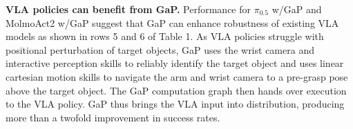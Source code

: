 
\textbf{VLA policies can benefit from GaP.} Performance for $\pi_{0.5}$ w/GaP and MolmoAct2 w/GaP suggest that GaP can enhance robustness of existing VLA models as shown in rows 5 and 6 of Table 1. As VLA policies struggle with positional perturbation of target objects, GaP uses the wrist camera and interactive perception skills to reliably identify the target object and uses linear cartesian motion skills to navigate the arm and wrist camera to a pre-grasp pose above the target object. The GaP computation graph then hands over execution to the VLA policy.  GaP thus brings the VLA input into distribution, producing more than a twofold improvement in success rates. %

